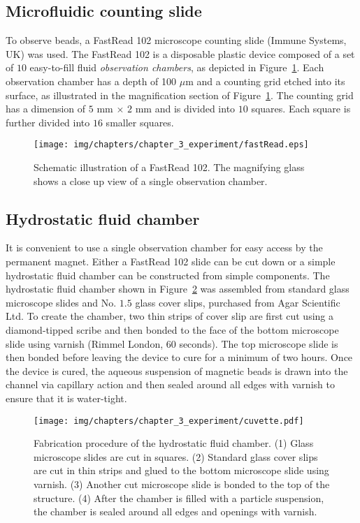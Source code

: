 \subsection{Microfluidic counting slide}\label{subsec:microfluidicCountingSlide}
To observe beads, a FastRead 102 microscope counting slide (Immune Systems, UK) was used. The FastRead 102 is a disposable plastic device composed of a set of $10$ easy-to-fill fluid \textit{observation chambers}, as depicted in Figure~\ref{fig:fastRead102}. Each observation chamber has a depth of 100 $\mu$m and a counting grid etched into its surface, as illustrated in the magnification section of Figure~\ref{fig:fastRead102}. The counting grid has a dimension of $5$ mm $\times$ $2$ mm and is divided into $10$ squares. Each square is further divided into $16$ smaller squares.

\begin{figure}[htb]
	\centering
   \texttt{[image: img/chapters/chapter\_3\_experiment/fastRead.eps]}
	\caption[FastRead 102 Slide schematic]{Schematic illustration of a FastRead 102. The magnifying glass shows a close up view of a single observation chamber.}
\label{fig:fastRead102}
\end{figure}

\subsection{Hydrostatic fluid chamber}\label{subsec:hydrostaticFluidChamber}
It is convenient to use a single observation chamber for easy access by the permanent magnet. Either a FastRead 102 slide can be cut down or a simple hydrostatic fluid chamber can be constructed from simple components. The hydrostatic fluid chamber shown in Figure~\ref{fig:hydrostaticFluidChamber} was assembled from standard glass microscope slides and No. $1.5$ glass cover slips, purchased from Agar Scientific Ltd. To create the chamber, two thin strips of cover slip are first cut using a diamond-tipped scribe and then bonded to the face of the bottom microscope slide using varnish (Rimmel London, 60 seconds). The top microscope slide is then bonded before leaving the device to cure for a minimum of two hours. Once the device is cured, the aqueous suspension of magnetic beads is drawn into the channel via capillary action and then sealed around all edges with varnish to ensure that it is water-tight.

\begin{figure}[htb]
	\centering
   \texttt{[image: img/chapters/chapter\_3\_experiment/cuvette.pdf]}
	\caption[Hydrostatic fluid chamber fabrication procedure]{Fabrication procedure of the hydrostatic fluid chamber. (1) Glass microscope slides are cut in squares. (2) Standard glass cover slips are cut in thin strips and glued to the bottom microscope slide using varnish. (3) Another cut microscope slide is bonded to the top of the structure. (4) After the chamber is filled with a particle suspension, the chamber is sealed around all edges and openings with varnish.}
\label{fig:hydrostaticFluidChamber}
\end{figure}

